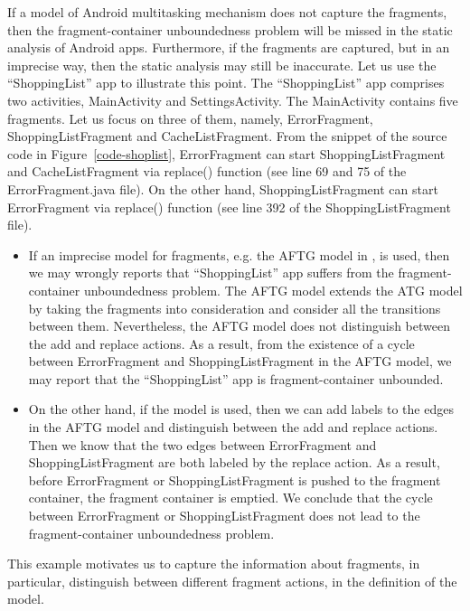 %
If a model of Android multitasking mechanism does not capture the fragments, then the fragment-container unboundedness problem will be missed in the static analysis of Android apps. 
Furthermore, if the fragments are captured, but in an imprecise way, then the static analysis may still be inaccurate. Let us use the ``ShoppingList'' app to illustrate this point. 
The ``ShoppingList'' app comprises two activities, MainActivity and SettingsActivity. The MainActivity contains five fragments. Let us focus on three of them, namely, ErrorFragment, ShoppingListFragment and CacheListFragment. From the snippet of the source code in Figure~\ref{code-shoplist}, ErrorFragment can start ShoppingListFragment and CacheListFragment via replace() function (see line 69 and 75 of the ErrorFragment.java file). On the other hand, ShoppingListFragment can start ErrorFragment via replace() function (see line 392 of the ShoppingListFragment file). 
%
\begin{itemize}
\item If an imprecise model for fragments, e.g. the AFTG model in \cite{CHGD18}, is used, then we may wrongly reports that ``ShoppingList'' app suffers from the fragment-container unboundedness problem. The AFTG model extends the ATG model by taking the fragments into consideration and consider all the transitions between them. Nevertheless, the AFTG model does not distinguish between the add and replace actions. As a result, from the existence of a cycle between ErrorFragment and ShoppingListFragment in the AFTG model, we may report that the ``ShoppingList'' app is fragment-container unbounded. 
%
\item On the other hand, if the {\AMASS} model is used, then we can add labels to the edges in the AFTG model and distinguish between the add and replace actions. Then we know that the two edges between ErrorFragment and ShoppingListFragment are both labeled by the replace action. As a result, before ErrorFragment or ShoppingListFragment is pushed to the fragment container, the fragment container is emptied. We conclude that the cycle between ErrorFragment or ShoppingListFragment does not lead to the fragment-container unboundedness problem. 
\end{itemize}
This example motivates us to capture the information about fragments, in particular, distinguish between different fragment actions, in the definition of the {\AMASS} model.

